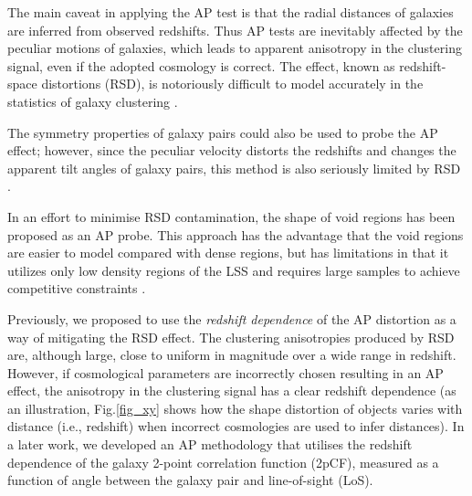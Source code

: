 \documentclass[prl,twocolumn,superscriptaddress,aps,amsmath,amssymb,nofootinbib,altaffilletter]{revtex4}
\begin{document}

The main caveat in applying the AP test is that 
the radial distances of galaxies are inferred from observed redshifts.
Thus AP tests are inevitably affected by the peculiar motions of galaxies,
which leads to apparent anisotropy in the clustering signal, even if the adopted cosmology is correct.
The effect, known as redshift-space distortions (RSD),
is notoriously difficult to model accurately in the statistics of galaxy clustering \citep{Ballinger1996}.

The symmetry properties of galaxy pairs\cite{Marinoni2010}  could also be used to probe the AP effect;
however, since the peculiar velocity distorts the redshifts and changes the apparent tilt angles of galaxy pairs,
this method is also seriously limited by RSD \citep{Jennings2011}.

In an effort to minimise RSD contamination, the shape of void regions\cite{Ryden1995,LavausWandelt1995}  has been 
proposed as an AP probe. This approach has the advantage that the void regions are easier to model compared with dense regions, but has limitations in that it utilizes only low density regions of the LSS and requires large samples to achieve competitive constraints \citep{Qingqing2016}.


Previously, we proposed to use the  {\it redshift dependence} of the AP distortion\cite{Li2014} as a way of mitigating the RSD effect. The clustering anisotropies produced by RSD are, although large, close to uniform in magnitude over a wide range in redshift.  However, if cosmological parameters are incorrectly chosen resulting in an AP effect, 
the anisotropy in the clustering signal has a clear redshift dependence
(as an illustration, Fig.\ref{fig_xy} shows how the shape distortion of objects varies with distance (i.e., redshift) 
when incorrect cosmologies are used to infer distances).
In a later work\cite{Li2015}, we developed an AP methodology 
that utilises the redshift dependence of the galaxy 2-point correlation function (2pCF), 
measured as a function of angle between the galaxy pair and line-of-sight (LoS).
\end{document}
